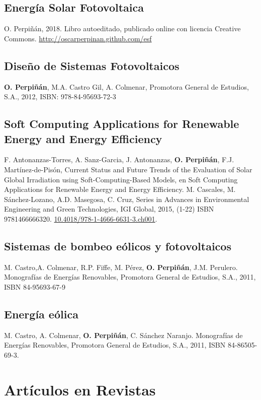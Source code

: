 \documentclass[article, a4paper]{memoir}
\begin{document}
\subsection{Energía Solar Fotovoltaica}
\label{sec:org61279bd}
O. Perpiñán, 2018. Libro autoeditado, publicado online con licencia Creative Commons.  \url{http://oscarperpinan.github.com/esf}

\subsection{Diseño de Sistemas Fotovoltaicos}
\label{sec:orgcdc77ab}
\textbf{O. Perpiñán}, M.A. Castro Gil, A. Colmenar, Promotora General de Estudios, S.A., 2012, ISBN: 978-84-95693-72-3

\subsection{Soft Computing Applications for Renewable Energy and Energy Efficiency}
\label{sec:org2f0fef0}
F. Antonanzas-Torres, A. Sanz-Garcia, J. Antonanzas, \textbf{O. Perpiñán}, F.J. Martínez-de-Pisón, Current Status and Future Trends of the Evaluation of Solar Global Irradiation using Soft-Computing-Based Models, en Soft Computing Applications for Renewable Energy and Energy Efficiency. M. Cascales, M. Sánchez-Lozano, A.D. Masegosa, C. Cruz,  Series in Advances in Environmental Engineering and Green Technologies, IGI Global, 2015, (1-22) ISBN 9781466666320. \href{http://dx.doi.org/10.4018/978-1-4666-6631-3.ch001}{10.4018/978-1-4666-6631-3.ch001}.

\subsection{Sistemas de bombeo eólicos y fotovoltaicos}
\label{sec:orgf878c9f}
M. Castro,A. Colmenar, R.P. Fiffe, M. Pérez, \textbf{O. Perpiñán}, J.M. Perulero. Monografías de Energías Renovables, Promotora General de Estudios, S.A., 2011, ISBN 84-95693-67-9

\subsection{Energía eólica}
\label{sec:org425669d}
M. Castro, A. Colmenar, \textbf{O. Perpiñán}, C. Sánchez Naranjo. Monografías de Energías Renovables, Promotora General de Estudios, S.A., 2011, ISBN 84-86505-69-3.

\section{Artículos en Revistas}
\label{sec:orgd5d021c}
\end{document}
